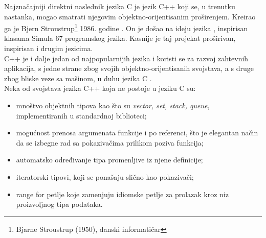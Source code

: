 \documentclass[a4paper]{article}
\begin{document}
Najznačajniji direktni naslednik jezika C je jezik C++ koji se, u trenutku nastanka, mogao smatrati njegovim objektno-orijentisanim proširenjem. Kreirao ga je Bjern Stroustrup\footnote{Bjarne Stroustrup (1950), danski informatičar} 1986. godine \cite{programiranje2}. On je došao na ideju jezika , inspirisan klasama Simula 67 programskog jezika. Kasnije je taj projekat proširivan, inspirisan i drugim jezicima.
\\
C++ je i dalje jedan od najpopularnijih jezika i koristi se za razvoj zahtevnih aplikacija, s jedne strane zbog svojih objektno-orijentisanih svojstava, a s druge zbog bliske veze sa mašinom, u duhu jezika C \cite{programiranje2}\cite{history}.\\

Neka od svojstava jezika C++ koja ne postoje u jeziku C su:
\begin{itemize}
    \item mnoštvo objektnih tipova kao što su {\em vector, set, stack, queue}, implementiranih u standardnoj biblioteci;
    \item mogućnost prenosa argumenata funkcije i po referenci, što je elegantan način da se izbegne rad sa pokazivačima prilikom poziva funkcija;
    \item automatsko određivanje tipa promenljive iz njene definicije;
    \item iteratorski tipovi, koji se ponašaju slično kao pokazivači;
    \item range for petlje koje zamenjuju idiomske petlje za prolazak kroz niz proizvoljnog tipa podataka.
\end{itemize}
\end{document}
